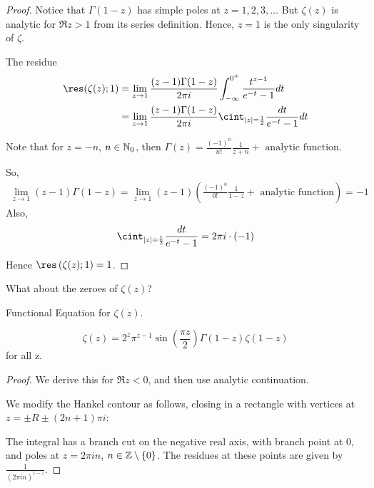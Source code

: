 \documentclass[a4paper]{article}
\begin{document}
\begin{proof}
	Notice that $\Gamma(1-z)$ has simple poles at $z = 1,2,3,\ldots$
	But $\zeta(z) $ is analytic for $\Re z > 1$ from its series definition. Hence, $z=1$ is the only singularity of $\zeta$.

	The residue
	\begin{align*}
		\res(\zeta(z); 1) &= \lim_{z\to 1} \frac{(z-1) \Gamma(1-z)}{2\pi i} \int_{-\infty}^{0^{+}} \frac{t^{z-1}}{e^{-t} - 1} dt \\
		&= \lim_{z\to 1} \frac{(z-1)\Gamma(1-z)}{2\pi i} \cint_{|z| = \frac{1}{2}} \frac{dt}{e^{-t} - 1} dt
	\end{align*}

	Note that for $z = -n$, $n \in \mathbb{N}_0$, then $\Gamma(z) = \frac{(-1)^{n}}{n!} \frac{1}{z+n} + \text{ analytic function}$.

	So,
	\begin{align*}
		\lim_{z\to 1} (z-1) \Gamma(1-z) = \lim_{z\to 1} (z-1) \left( \frac{(-1)^{0}}{0!} \frac{1}{1-z} + \text{ analytic function} \right) = -1
	\end{align*}
	Also,
	\[
		\cint_{|z|=\frac{1}{2}} \frac{dt}{e^{-t} - 1} = 2\pi i \cdot  (-1)
	\]

	Hence $\res\left( \zeta(z) ; 1 \right) = 1$. 
\end{proof}

What about the zeroes of $\zeta(z)$? 

\begin{prop}
	Functional Equation for $\zeta(z)$.

	 \[
		 \zeta(z) = 2^{z} \pi^{z-1} \sin\left( \frac{\pi z}{2} \right) \Gamma(1-z) \zeta(1-z)
	 \] for all z.
\end{prop}

\begin{proof}
	We derive this for $\Re z < 0$, and then use analytic continuation.

	We modify the Hankel contour as follows, closing in a rectangle with vertices at $z = \pm R \pm (2n + 1) \pi i$:
\begin{figure}[H]
    \centering
\end{figure}

The integral has a branch cut on the negative real axis, with branch point at $0$, and poles at $z = 2\pi i n$, $n \in \mathbb{Z}\setminus \{0\} $. The residues at these points are given by $\frac{1}{(2\pi i n)^{1-z}}$. 

\end{proof}
\end{document}
